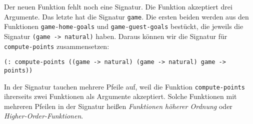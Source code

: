 Der neuen Funktion fehlt noch eine Signatur.  Die Funktion akzeptiert
drei Argumente.  Das letzte hat die Signatur \lstinline{game}.  Die
ersten beiden werden aus den Funktionen \lstinline{game-home-goals}
und \lstinline{game-guest-goals} bestückt, die jeweils die Signatur
\lstinline{(game -> natural)} haben.  Daraus können wir die Signatur
für \lstinline{compute-points} zusammensetzen:
%
\begin{lstlisting}
(: compute-points ((game -> natural) (game -> natural) game -> points))
\end{lstlisting}
%
In der Signatur tauchen mehrere Pfeile auf, weil die Funktion
\lstinline{compute-points} ihrerseits zwei Funktionen als Argumente
akzeptiert.  Solche Funktionen mit mehreren Pfeilen in der Signatur
heißen \textit{Funktionen höherer Ordnung} oder
\textit{Higher-Order-Funktionen}.

